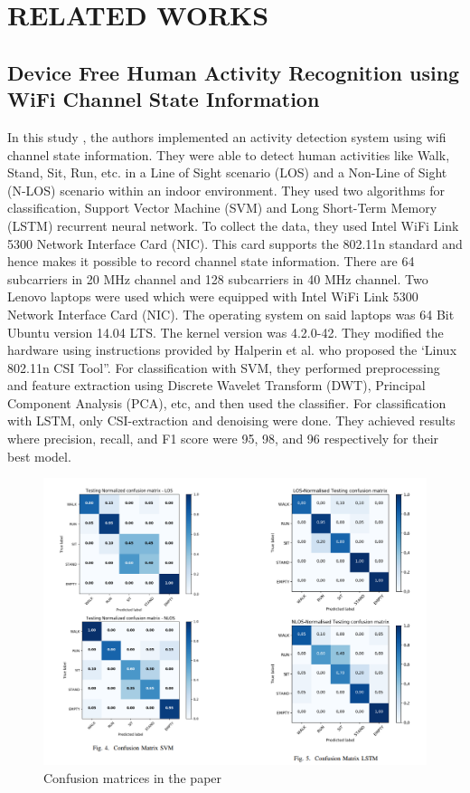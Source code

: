 \chapter{RELATED WORKS}
\label{Chapter 2}

\section{Device Free Human Activity Recognition using WiFi Channel State Information}
In this study \cite{9060143}, the authors implemented an activity detection system using wifi channel state information. They were able to detect human activities like Walk, Stand, Sit, Run, etc. in a Line of Sight scenario (LOS) and a Non-Line of Sight (N-LOS) scenario within an indoor environment. They used two algorithms for classification, Support Vector Machine (SVM) and Long Short-Term Memory (LSTM) recurrent neural network. To collect the data, they used Intel WiFi Link 5300 Network Interface Card (NIC). This card supports the 802.11n standard and hence makes it possible to record channel state information. There are 64 subcarriers in 20 MHz channel and 128 subcarriers in 40 MHz channel. Two Lenovo laptops were used which were equipped with Intel WiFi Link 5300 Network Interface Card (NIC). The operating system on said laptops was 64 Bit Ubuntu version 14.04 LTS. The kernel version was 4.2.0-42. They modified the hardware using instructions provided by  Halperin et al. \cite{10.1145/1925861.1925870} who proposed the ‘Linux 802.11n CSI Tool”. For classification with SVM, they performed preprocessing and feature extraction using Discrete Wavelet Transform (DWT), Principal Component Analysis (PCA), etc, and then used the classifier. For classification with LSTM, only CSI-extraction and denoising were done. They achieved results where precision, recall, and F1 score were 95, 98, and 96 respectively for their best model.
\begin{figure}[H]
\centering
\includegraphics[width=1\textwidth]{./figure/chap 2/figure-1.png}
\caption{Confusion matrices in the paper}
\label{2.1}
\end{figure}

